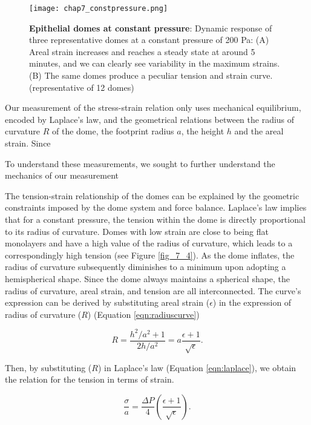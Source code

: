 \begin{figure}[b!]
	\centering
	\texttt{[image: chap7\_constpressure.png]}
	\caption{\label{fig_7_3} \textbf{Epithelial domes at constant pressure}: Dynamic response of three representative domes at a constant pressure of 200 Pa: (A) Areal strain increases and reaches a steady state at around 5 minutes, and we can clearly see variability in the maximum strains. (B) The same domes produce a peculiar tension and strain curve. (representative of 12 domes)
	}
\end{figure}

Our measurement of the stress-strain relation only uses mechanical equilibrium, encoded by Laplace's law, and the geometrical relations between the radius of curvature $R$ of the dome, the footprint radius $a$, the height $h$ and the areal strain. Since  

To understand these measurements, we sought to further understand the mechanics of our measurement


The tension-strain relationship of the domes can be explained by the geometric constraints imposed by the dome system and force balance. Laplace’s law implies that for a constant pressure, the tension within the dome is directly proportional to its radius of curvature. Domes with low strain are close to being flat monolayers and have a high value of the radius of curvature, which leads to a correspondingly high tension  (see Figure \ref{fig_7_4}). As the dome inflates, the radius of curvature subsequently diminishes to a minimum upon adopting a hemispherical shape. Since the dome always maintains a spherical shape, the radius of curvature, areal strain, and tension are all interconnected. The curve's expression can be derived by substituting areal strain ($\epsilon$) in the expression of radius of curvature ($R$) (Equation \ref{eqn:radiuscurve})

\begin{equation}
	R = \frac{h^2/a^2 + 1}{2h/a^2} = a\frac{\epsilon + 1}{\sqrt{\epsilon}}.
\end{equation}

Then, by substituting ($R$) in Laplace's law (Equation \ref{eqn:laplace}), we obtain the relation for the tension in terms of strain.

\begin{equation}
	\label{eqn:isobaric}
	\frac{\sigma}{a} = \frac{\Delta P}{4} \left( \frac{\epsilon + 1}{\sqrt{\epsilon}} \right).
\end{equation}

